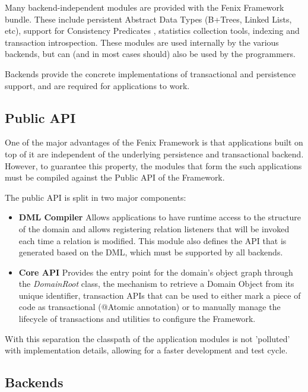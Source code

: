 Many backend-independent modules are provided with the Fenix Framework
bundle. These include persistent Abstract Data Types (B+Trees, Linked
Lists, etc), support for Consistency
Predicates \cite{JoaoCoutinhoNeves2011}, statistics collection tools,
indexing and transaction introspection. These modules are used
internally by the various backends, but can (and in most cases should)
also be used by the programmers.

Backends provide the concrete implementations of transactional and
persistence support, and are required for applications to work.

\subsection{Public API}

One of the major advantages of the Fenix Framework is that
applications built on top of it are independent of the underlying
persistence and transactional backend. However, to guarantee this
property, the modules that form the such applications must be compiled
against the Public API of the Framework.

The public API is split in two major components:

\begin{itemize}
\item {\bf DML Compiler} Allows applications to have runtime access to
  the structure of the domain and allows registering relation
  listeners that will be invoked each time a relation is
  modified. This module also defines the API that is generated based
  on the DML, which must be supported by all backends.

\item {\bf Core API} Provides the entry point for the domain's object
graph through the {\it DomainRoot} class, the mechanism to retrieve a
Domain Object from its unique identifier, transaction APIs that can be
used to either mark a piece of code as transactional (@Atomic
annotation) or to manually manage the lifecycle of transactions and
utilities to configure the Framework.
\end{itemize}

With this separation the classpath of the application modules is not
'polluted' with implementation details, allowing for a faster
development and test cycle.

\subsection{Backends}

